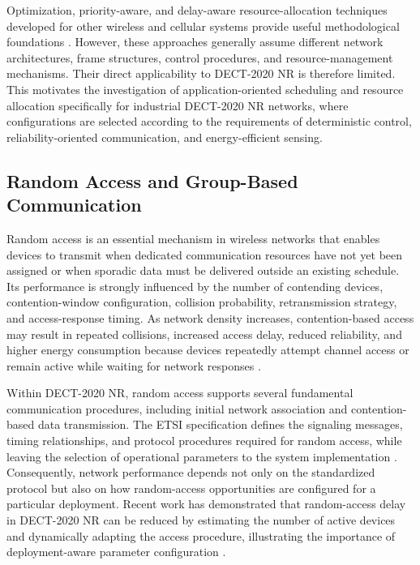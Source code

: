 \documentclass[12pt,a4paper]{article}
\begin{document}
Optimization, priority-aware, and delay-aware resource-allocation techniques developed for other wireless and cellular systems provide useful methodological foundations \cite{andrewsProvidingQualityService2001,liuEfficientResourceAllocation2024,bahetiPriorityawareRadioResource2026nr1}. However, these approaches generally assume different network architectures, frame structures, control procedures, and resource-management mechanisms. Their direct applicability to DECT-2020 NR is therefore limited. This motivates the investigation of application-oriented scheduling and resource allocation specifically for industrial DECT-2020 NR networks, where configurations are selected according to the requirements of deterministic control, reliability-oriented communication, and energy-efficient sensing.

\subsection{Random Access and Group-Based Communication}
\label{subsec:random_access}

Random access is an essential mechanism in wireless networks that enables devices to transmit when dedicated communication resources have not yet been assigned or when sporadic data must be delivered outside an existing schedule. Its performance is strongly influenced by the number of contending devices, contention-window configuration, collision probability, retransmission strategy, and access-response timing. As network density increases, contention-based access may result in repeated collisions, increased access delay, reduced reliability, and higher energy consumption because devices repeatedly attempt channel access or remain active while waiting for network responses \cite{andrewsProvidingQualityService2001,fattahOverviewSchedulingAlgorithms2002a}.

Within DECT-2020 NR, random access supports several fundamental communication procedures, including initial network association and contention-based data transmission. The ETSI specification defines the signaling messages, timing relationships, and protocol procedures required for random access, while leaving the selection of operational parameters to the system implementation \cite{etsi_ts103636_4}. Consequently, network performance depends not only on the standardized protocol but also on how random-access opportunities are configured for a particular deployment. Recent work has demonstrated that random-access delay in DECT-2020 NR can be reduced by estimating the number of active devices and dynamically adapting the access procedure, illustrating the importance of deployment-aware parameter configuration \cite{gaidamakaOptimizingDelaysRandom2025}.
\end{document}
